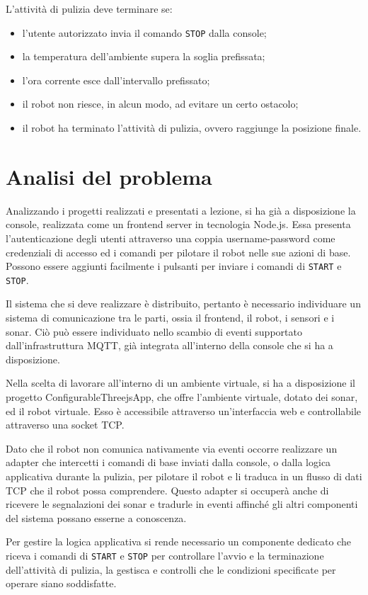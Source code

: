L'attività di pulizia deve terminare se:
\begin{itemize}
\item l'utente autorizzato invia il comando \texttt{STOP} dalla console;
\item la temperatura dell'ambiente supera la soglia prefissata;
\item l'ora corrente esce dall'intervallo prefissato;
\item il robot non riesce, in alcun modo, ad evitare un certo ostacolo;
\item il robot ha terminato l'attività di pulizia, ovvero raggiunge la posizione finale.
\end{itemize}

\section{Analisi del problema}
Analizzando i progetti realizzati e presentati a lezione, si ha già a disposizione la console, realizzata come un frontend server in tecnologia Node.js. Essa presenta l'autenticazione degli utenti attraverso una coppia username-password come credenziali di accesso ed i comandi per pilotare il robot nelle sue azioni di base. Possono essere aggiunti facilmente i pulsanti per inviare i comandi di \texttt{START} e \texttt{STOP}.

Il sistema che si deve realizzare è distribuito, pertanto è necessario individuare un sistema di comunicazione tra le parti, ossia il frontend, il robot, i sensori e i sonar. Ciò può essere individuato nello scambio di eventi supportato dall'infrastruttura MQTT, già integrata all'interno della console che si ha a disposizione. 

Nella scelta di lavorare all'interno di un ambiente virtuale, si ha a disposizione il progetto ConfigurableThreejsApp, che offre l'ambiente virtuale, dotato dei sonar, ed il robot virtuale. Esso è accessibile attraverso un'interfaccia web e controllabile attraverso una socket TCP.

Dato che il robot non comunica nativamente via eventi occorre realizzare un adapter che intercetti i comandi di base inviati dalla console, o dalla logica applicativa durante la pulizia, per pilotare il robot e li traduca in un flusso di dati TCP che il robot possa comprendere. Questo adapter si occuperà anche di ricevere le segnalazioni dei sonar e tradurle in eventi affinché gli altri componenti del sistema possano esserne a conoscenza.

Per gestire la logica applicativa si rende necessario un componente dedicato che riceva i comandi di \texttt{START} e \texttt{STOP} per controllare l'avvio e la terminazione dell'attività di pulizia, la gestisca e controlli che le condizioni specificate per operare siano soddisfatte.

